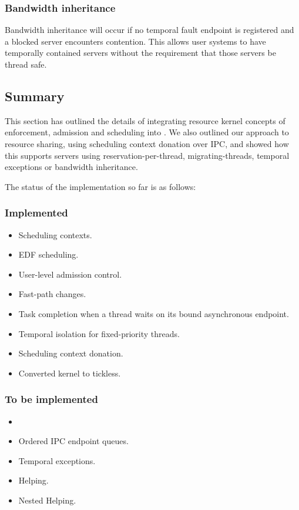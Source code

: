 \subsubsection{Bandwidth inheritance}

Bandwidth inheritance will occur if no temporal fault endpoint is registered and a blocked server encounters contention.
This allows user systems to have temporally contained servers without the requirement that those servers be thread safe.

\subsection{Summary}

This section has outlined the details of integrating resource kernel concepts of enforcement, admission and scheduling into \selfour.
We also outlined our approach to resource sharing, using scheduling context donation over IPC, and showed how this supports servers using reservation-per-thread, migrating-threads, temporal exceptions or bandwidth inheritance.

The status of the implementation so far is as follows:

\subsubsection{Implemented}

\begin{itemize}
\item Scheduling contexts.
\item EDF scheduling.
\item User-level admission control.
\item Fast-path changes.
\item Task completion when a thread waits on its bound asynchronous endpoint.
\item Temporal isolation for fixed-priority threads.
\item Scheduling context donation.
\item Converted kernel to tickless.
\end{itemize}

\subsubsection{To be implemented}

\begin{itemize}
\item \sendwait
\item Ordered \gls{IPC} endpoint queues.
\item Temporal exceptions.
\item Helping.
\item Nested Helping.
\end{itemize}


